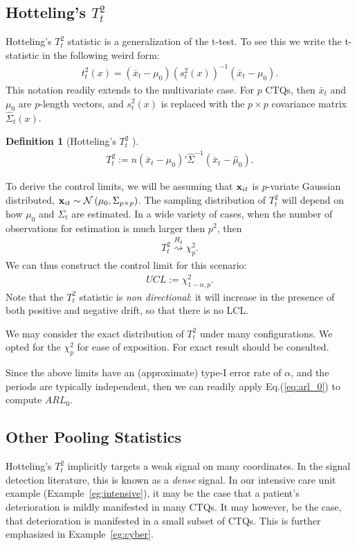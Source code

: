 \documentclass[12pt,a4paper]{report}
\theoremstyle{plain}
\theoremstyle{definition}
\newtheorem{definition}{Definition}
\newcommand{\tsq}{$T^2_t$ }
\begin{document}
\subsection{Hotteling's \tsq}
Hotteling's \tsq statistic is a generalization of the t-test.
To see this we write the t-statistic in the following weird form:
\begin{align}
	t^2_t(x)=(\bar{x}_t-\mu_0) (s^2_t(x))^{-1} (\bar{x}_t-\mu_0).
\end{align}
This notation readily extends to the multivariate case. 
For $p$ CTQs, then $\bar{x}_t$ and $\mu_0$ are $p$-length vectors, and $s^2_t(x)$ is replaced with the $p \times p$ covariance matrix $\hat{\Sigma}_t(x)$.
\begin{definition}[Hotteling's \tsq]
\begin{align}
\label{eq:hotteling}
	T^2_t := n (\bar{x}_t-\hat{\mu}_0)' \hat{\Sigma}^{-1} (\bar{x}_t-\hat{\mu}_0).
\end{align}
\end{definition}
To derive the control limits, we will be assuming that $\mathbf{x}_{it}$ is $p$-variate Gaussian distributed, $\mathbf{x}_{it}\sim \mathcal{N}\left(\mu_0, \Sigma_{p \times p}\right)$. 
The sampling distribution of $T^2_t$ will depend on how $\mu_0$ and $\Sigma_t$ are estimated. 
In a wide variety of cases, when the number of observations for estimation is much larger then $p^2$, then 
\begin{align}
	T^2_t \overset{H_0}{\rightsquigarrow }\chi^2_p.
\end{align}
We can thus construct the control limit for this scenario:
\begin{align}
	UCL:= \chi^2_{1-\alpha,p}.
\end{align}
Note that the \tsq statistic is \emph{non directional}: it will increase in the presence of both positive and negative drift, so that there is no LCL.

We may consider the exact distribution of \tsq under many configurations. 
We opted for the $\chi^2_p$ for ease of exposition. For exact result \cite[Ch.7]{qiu_introduction_2013} should be consulted. 

Since the above limits have an (approximate) type-I error rate of $\alpha$, and the periods are typically independent, then we can readily apply Eq.(\ref{eq:arl_0}) to compute $ARL_0$.



\subsection{Other Pooling Statistics}
Hotteling's \tsq implicitly targets a weak signal on many coordinates. 
In the signal detection literature, this is known as a \emph{dense} signal.
In our intensive care unit example (Example~\ref{eg:intensive}), it may be the case that a patient's deterioration is mildly manifested in many CTQs. It may however, be the case, that deterioration is manifested in a small subset of CTQs.
This is further emphasized in Example~\ref{eg:cyber}.
\end{document}
